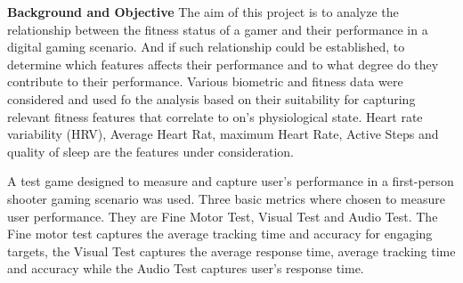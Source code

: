 \textbf{Background and Objective} The aim of this project is to analyze the relationship between the fitness status of a gamer and their 
performance in a digital gaming scenario. And if such relationship could be established, to determine which features affects their performance and 
to what degree do they contribute to their performance. 
Various biometric and fitness data were considered and used fo the analysis based on their suitability for capturing relevant fitness features that 
correlate to on's physiological state. Heart rate variability (HRV), Average Heart Rat, maximum Heart Rate, Active Steps and quality of sleep are the 
features under consideration. 

A test game designed to measure and capture user's performance in a first-person shooter gaming scenario was used. Three basic metrics where chosen 
to measure user performance. They are Fine Motor Test, Visual Test and Audio Test. The Fine motor test captures the average tracking time and accuracy 
for engaging targets, the Visual Test captures the average response time, average tracking time and accuracy while the Audio Test captures user's 
response time. 